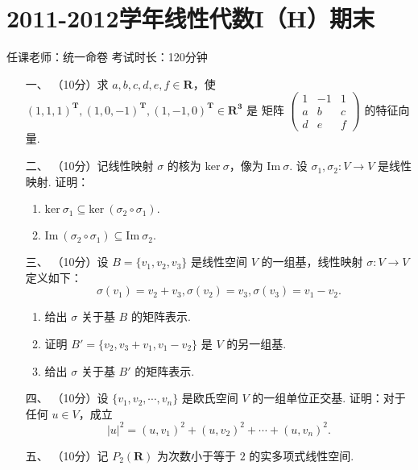\section*{2011-2012学年线性代数I（H）期末}

\begin{center}
    任课老师：统一命卷\hspace{4em} 考试时长：120分钟
\end{center}

\begin{enumerate}
    \item [一、]（10分）求 $a,b,c,d,e,f\in \mathbf{R}$，使 $(1,1,1)^\mathbf{T},(1,0,-1)^\mathbf{T},(1,-1,0)^\mathbf{T}\in \mathbf{R^3}$ 是
    矩阵 $\begin{pmatrix}1 & -1 & 1 \\ a & b & c \\ d & e & f\end{pmatrix}$ 的特征向量.
    \item [二、]（10分）记线性映射 $\sigma$ 的核为 $\mathrm{ker}\ \sigma$，像为 $\mathrm{Im}\ \sigma.$ 设 $\sigma_1,\sigma_2:V\to V$ 是线性映射. 证明：
    \begin{enumerate}[label=(\arabic*)]
        \item $\mathrm{ker}\ \sigma_1 \subseteq \mathrm{ker}\ (\sigma_2 \circ \sigma_1).$
        \item $\mathrm{Im}\ (\sigma_2 \circ \sigma_1) \subseteq \mathrm{Im}\ \sigma_2.$
    \end{enumerate}
    \item [三、]（10分）设 $B=\{v_1,v_2,v_3\}$ 是线性空间 $V$ 的一组基，线性映射 $\sigma:V\to V$ 定义如下：
    \[\sigma(v_1)=v_2+v_3,\sigma(v_2)=v_3,\sigma(v_3)=v_1-v_2.\]
    \begin{enumerate}[label=(\arabic*)]
        \item 给出 $\sigma$ 关于基 $B$ 的矩阵表示.
        \item 证明 $B'=\{v_2,v_3+v_1,v_1-v_2\}$ 是 $V$ 的另一组基.
        \item 给出 $\sigma$ 关于基 $B'$ 的矩阵表示.
    \end{enumerate}
    \item [四、]（10分）设 $\{v_1,v_2,\cdots,v_n\}$ 是欧氏空间 $V$ 的一组单位正交基. 证明：对于任何 $u\in V$，成立
    \[\lvert u \rvert^2 = (u,v_1)^2+(u,v_2)^2+\cdots+(u,v_n)^2.\]
    \item [五、]（10分）记 $P_2(\mathbf{R})$ 为次数小于等于 $2$ 的实多项式线性空间.

\end{enumerate}
